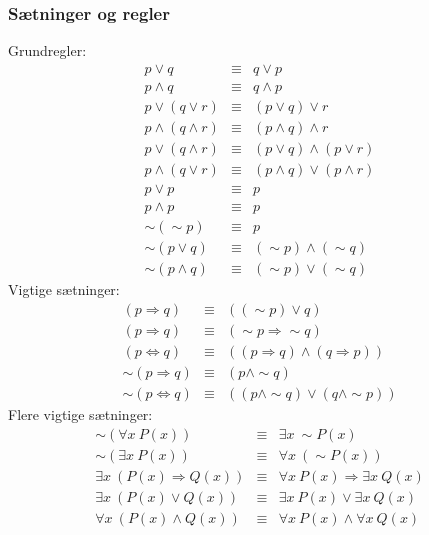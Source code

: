 \documentclass[a4paper]{article}
\begin{document}
    \subsubsection{Sætninger og regler}
      Grundregler:
      \begin{eqnarray}
        p \vee q &\equiv& q \vee p \\
        p \wedge q &\equiv& q \wedge p \\
        p \vee (q \vee r) &\equiv& (p \vee q) \vee r \\
        p \wedge (q \wedge r) &\equiv& (p \wedge q) \wedge r \\
        p \vee (q \wedge r) &\equiv& (p \vee q) \wedge (p \vee r) \\
        p \wedge (q \vee r) &\equiv& (p \wedge q) \vee (p \wedge r) \\
        p \vee p &\equiv& p \\
        p \wedge p &\equiv& p \\
        \sim (\sim p) &\equiv& p \\
        \sim (p \vee q) &\equiv& (\sim p) \wedge (\sim q) \\
        \sim (p \wedge q) &\equiv& (\sim p) \vee (\sim q) 
      \end{eqnarray}
      Vigtige sætninger:
      \begin{eqnarray}
        (p\Rightarrow q) &\equiv& ((\sim p) \vee q) \\
        (p \Rightarrow q) &\equiv& (\sim p \Rightarrow \sim q) \\
        (p \Leftrightarrow q) &\equiv& ((p \Rightarrow q) \wedge (q \Rightarrow p)) \\
        \sim (p \Rightarrow q) &\equiv& (p \wedge \sim q) \\
        \sim (p \Leftrightarrow q) &\equiv& ((p \wedge \sim q) \vee (q \wedge \sim p))
      \end{eqnarray}
      Flere vigtige sætninger:
      \begin{eqnarray}
        \sim (\forall x~P(x)) &\equiv& \exists x~\sim P(x) \\
        \sim (\exists x~P(x)) &\equiv& \forall x~(\sim P(x)) \\
        \exists x~(P(x) \Rightarrow Q(x)) &\equiv& \forall x~P(x) \Rightarrow \exists x~Q(x) \\
        \exists x~(P(x) \vee Q(x)) &\equiv& \exists x~P(x) \vee \exists x~Q(x) \\
        \forall x~(P(x) \wedge Q(x)) &\equiv& \forall x~P(x) \wedge \forall x~Q(x)
      \end{eqnarray}
\end{document}
